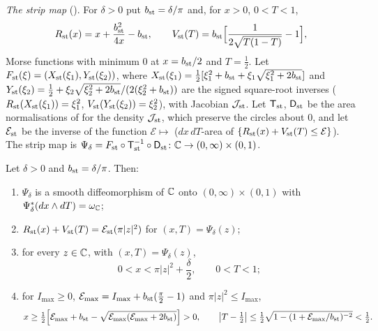 \emph{The strip map} (). For $\delta>0$ put $b_{\rm st}=\delta/\pi$ and, for $x>0$, $0<T<1$,
\[
 R_{\rm st}(x)=x+\frac{b_{\rm st}^2}{4x}-b_{\rm st},\qquad
 V_{\rm st}(T)=b_{\rm st}\Big[\frac{1}{2\sqrt{T(1-T)}}-1\Big],
\]
Morse functions with minimum $0$ at $x=b_{\rm st}/2$ and $T=\frac12$. Let $F_{\rm st}(\xi)=(X_{\rm st}(\xi_1),Y_{\rm st}(\xi_2))$, where
$X_{\rm st}(\xi_1)=\frac12[\xi_1^2+b_{\rm st}+\xi_1\sqrt{\xi_1^2+2b_{\rm st}}]$ and
$Y_{\rm st}(\xi_2)=\frac12+\xi_2\sqrt{\xi_2^2+2b_{\rm st}}/(2(\xi_2^2+b_{\rm st}))$ are the signed square-root inverses
($R_{\rm st}(X_{\rm st}(\xi_1))=\xi_1^2$, $V_{\rm st}(Y_{\rm st}(\xi_2))=\xi_2^2$), with Jacobian $\mathcal J_{\rm st}$. Let
$\mathsf T_{\rm st}$, $\mathsf D_{\rm st}$ be the area normalisations of  for the density
$\mathcal J_{\rm st}$, which preserve the circles about $0$, and let $\mathcal E_{\rm st}$ be the inverse of the function
$\mathcal E\mapsto$ ($dx\,dT$-area of $\{R_{\rm st}(x)+V_{\rm st}(T)\le\mathcal E\}$). The strip map is
$\Psi_\delta=F_{\rm st}\circ\mathsf T_{\rm st}^{-1}\circ\mathsf D_{\rm st}\colon\mathbb{C}\to(0,\infty)\times(0,1)$.

\begin{proposition}\label{I:prop:str-strip}\label{I:prop:hdl-strip}
Let $\delta>0$ and $b_{\rm st}=\delta/\pi$. Then:
\begin{enumerate}[label=(\roman*)]
\item $\Psi_\delta$ is a smooth diffeomorphism of $\mathbb{C}$ onto $(0,\infty)\times(0,1)$ with
$\Psi_\delta^*(dx\wedge dT)=\omega_{\mathbb{C}}$;
\item $R_{\rm st}(x)+V_{\rm st}(T)=\mathcal E_{\rm st}(\pi|z|^2)$ for $(x,T)=\Psi_\delta(z)$;
\item for every $z\in\mathbb{C}$, with $(x,T)=\Psi_\delta(z)$,
\begin{equation}\label{I:eq:str-x-bound}
 0<x<\pi|z|^2+\frac\delta2,\qquad 0<T<1;
\end{equation}
\item for $I_{\max}\ge0$, $\mathcal E_{\max}=I_{\max}+b_{\rm st}(\frac\pi2-1)$ and $\pi|z|^2\le I_{\max}$,
\[
 x\ge\tfrac12\Big[\mathcal E_{\max}+b_{\rm st}-\sqrt{\mathcal E_{\max}(\mathcal E_{\max}+2b_{\rm st})}\Big]>0,\qquad
 \big|T-\tfrac12\big|\le\tfrac12\sqrt{1-(1+\mathcal E_{\max}/b_{\rm st})^{-2}}<\tfrac12 .
\]
\end{enumerate}
\end{proposition}

